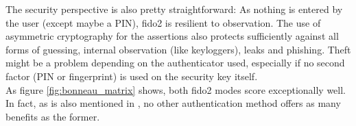 \noindent The security perspective is also pretty straightforward: As nothing is entered by the user (except maybe a PIN), \ac{fido2} is resilient to observation. The use of asymmetric cryptography for the assertions also protects sufficiently against all forms of guessing, internal observation (like keyloggers), leaks and phishing. Theft might be a problem depending on the authenticator used, especially if no second factor (PIN or fingerprint) is used on the security key itself.\\

\noindent As figure \ref{fig:bonneau_matrix} shows, both \ac{fido2} modes score exceptionally well. In fact, as is also mentioned in \cite{lyastani2020}, no other authentication method offers as many benefits as the former.